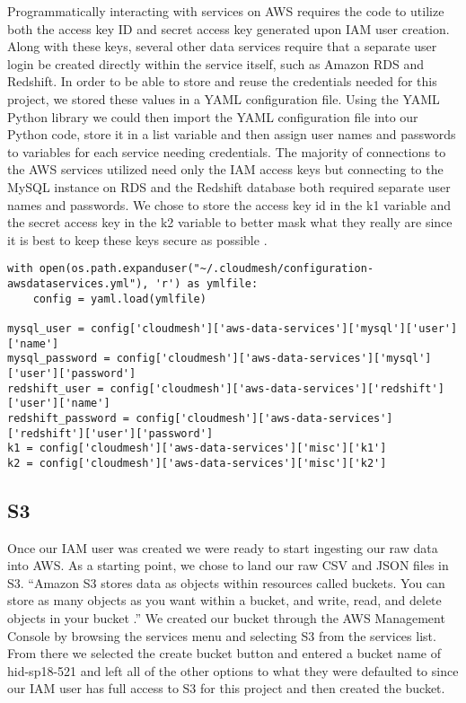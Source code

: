 Programmatically interacting with services on AWS requires the code to utilize 
both the access key ID and secret access key generated upon IAM user creation. 
Along with these keys, several other data services require that a separate 
user login be created directly within the service itself, such as Amazon RDS 
and Redshift. In order to be able to store and reuse the credentials needed 
for this project, we stored these values in a YAML configuration file. Using 
the YAML Python library we could then import the YAML configuration file into 
our Python code, store it in a list variable and then assign user names and 
passwords to variables for each service needing credentials. The majority of 
connections to the AWS services utilized need only the IAM access keys but 
connecting to the MySQL instance on RDS and the Redshift database both 
required separate user names and passwords. We chose to store the access key 
id in the k1 variable and the secret access key in the k2 variable to better 
mask what they really are since it is best to keep these keys secure as 
possible \cite{hid-sp18-521-IAMkeys}. 

\begin{verbatim}
with open(os.path.expanduser("~/.cloudmesh/configuration-awsdataservices.yml"), 'r') as ymlfile:
    config = yaml.load(ymlfile)

mysql_user = config['cloudmesh']['aws-data-services']['mysql']['user']['name']
mysql_password = config['cloudmesh']['aws-data-services']['mysql']['user']['password']
redshift_user = config['cloudmesh']['aws-data-services']['redshift']['user']['name']
redshift_password = config['cloudmesh']['aws-data-services']['redshift']['user']['password']
k1 = config['cloudmesh']['aws-data-services']['misc']['k1']
k2 = config['cloudmesh']['aws-data-services']['misc']['k2']
\end{verbatim}

\subsection{S3}

Once our IAM user was created we were ready to start ingesting our raw data 
into AWS. As a starting point, we chose to land our raw CSV and JSON files in 
S3. ``Amazon S3 stores data as objects within resources called buckets. You 
can store as many objects as you want within a bucket, and write, read, and 
delete objects in your bucket \cite{hid-sp18-521-S3features}.'' We created our 
bucket through the AWS Management Console by browsing the services menu and 
selecting S3 from the services list. From there we selected the create bucket 
button and entered a bucket name of hid-sp18-521 and left all of the other 
options to what they were defaulted to since our IAM user has full access to 
S3 for this project and then created the bucket. 

